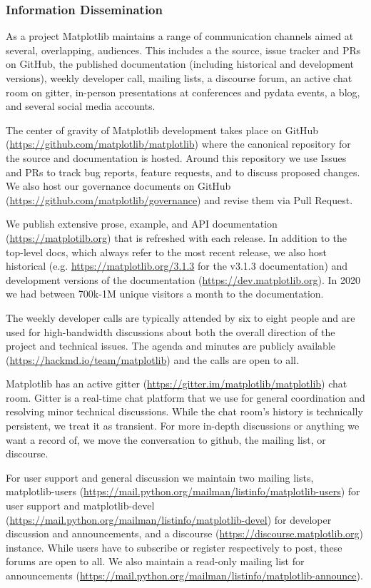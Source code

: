 \documentclass[12pt]{article}
\numberwithin{page}{section}
\begin{document}
\subsubsection{Information Dissemination}

As a project Matplotlib maintains a range of communication channels
aimed at several, overlapping, audiences.  This includes a
the source, issue tracker and PRs on GitHub,
the published documentation (including historical and development versions),
weekly developer call,
mailing lists,
a discourse forum,
an active chat room on gitter,
in-person presentations at conferences and pydata events,
a blog, and several social media accounts.


The center of gravity of Matplotlib development takes place on GitHub
(\url{https://github.com/matplotlib/matplotlib}) where the canonical
repository for the source and documentation is hosted.  Around this
repository we use Issues and PRs to track bug reports, feature
requests, and to discuss proposed changes.  We also host our
governance documents on GitHub
(\url{https://github.com/matplotlib/governance}) and revise them via
Pull Request.

We publish extensive prose, example, and API documentation
(\url{https://matplotilb.org}) that is refreshed with each release.
In addition to the top-level docs, which always refer to the most
recent release, we also host historical
(e.g. \url{https://matplotlib.org/3.1.3} for the v3.1.3 documentation) and
development versions of the documentation
(\url{https://dev.matplotlib.org}).  In 2020 we had between 700k-1M
unique visitors a month to the documentation.


The weekly developer calls are typically attended by six to eight
people and are used for high-bandwidth discussions about both the
overall direction of the project and technical issues.  The agenda and
minutes are publicly available
(\url{https://hackmd.io/team/matplotlib}) and the calls are open to
all.

Matplotlib has an active gitter
(\url{https://gitter.im/matplotlib/matplotlib}) chat room.  Gitter is
a real-time chat platform that we use for general coordination and
resolving minor technical discussions.  While the chat room's history
is technically persistent, we treat it as transient.  For more
in-depth discussions or anything we want a record of, we move the
conversation to github, the mailing list, or discourse.

For user support and general discussion we maintain two mailing lists,
matplotlib-users
(\url{https://mail.python.org/mailman/listinfo/matplotlib-users}) for
user support and matplotlib-devel
(\url{https://mail.python.org/mailman/listinfo/matplotlib-devel}) for
developer discussion and announcements, and a discourse
(\url{https://discourse.matplotlib.org}) instance.  While users have
to subscribe or register respectively to post, these forums are open
to all.  We also maintain a read-only mailing list for announcements
(\url{https://mail.python.org/mailman/listinfo/matplotlib-announce}).
\end{document}
